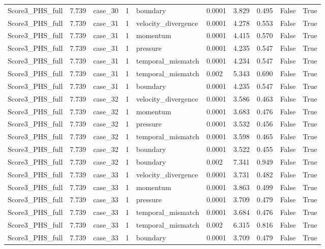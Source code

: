 \begin{longtable}{llllllllll}
Score3\_PHS\_full & 7.739 & case\_30 & 1 & boundary & 0.0001 & 3.829 & 0.495 & False & True \\
Score3\_PHS\_full & 7.739 & case\_31 & 1 & velocity\_divergence & 0.0001 & 4.278 & 0.553 & False & True \\
Score3\_PHS\_full & 7.739 & case\_31 & 1 & momentum & 0.0001 & 4.415 & 0.570 & False & True \\
Score3\_PHS\_full & 7.739 & case\_31 & 1 & pressure & 0.0001 & 4.235 & 0.547 & False & True \\
Score3\_PHS\_full & 7.739 & case\_31 & 1 & temporal\_mismatch & 0.0001 & 4.234 & 0.547 & False & True \\
Score3\_PHS\_full & 7.739 & case\_31 & 1 & temporal\_mismatch & 0.002 & 5.343 & 0.690 & False & True \\
Score3\_PHS\_full & 7.739 & case\_31 & 1 & boundary & 0.0001 & 4.235 & 0.547 & False & True \\
Score3\_PHS\_full & 7.739 & case\_32 & 1 & velocity\_divergence & 0.0001 & 3.586 & 0.463 & False & True \\
Score3\_PHS\_full & 7.739 & case\_32 & 1 & momentum & 0.0001 & 3.683 & 0.476 & False & True \\
Score3\_PHS\_full & 7.739 & case\_32 & 1 & pressure & 0.0001 & 3.532 & 0.456 & False & True \\
Score3\_PHS\_full & 7.739 & case\_32 & 1 & temporal\_mismatch & 0.0001 & 3.598 & 0.465 & False & True \\
Score3\_PHS\_full & 7.739 & case\_32 & 1 & boundary & 0.0001 & 3.522 & 0.455 & False & True \\
Score3\_PHS\_full & 7.739 & case\_32 & 1 & boundary & 0.002 & 7.341 & 0.949 & False & True \\
Score3\_PHS\_full & 7.739 & case\_33 & 1 & velocity\_divergence & 0.0001 & 3.731 & 0.482 & False & True \\
Score3\_PHS\_full & 7.739 & case\_33 & 1 & momentum & 0.0001 & 3.863 & 0.499 & False & True \\
Score3\_PHS\_full & 7.739 & case\_33 & 1 & pressure & 0.0001 & 3.709 & 0.479 & False & True \\
Score3\_PHS\_full & 7.739 & case\_33 & 1 & temporal\_mismatch & 0.0001 & 3.684 & 0.476 & False & True \\
Score3\_PHS\_full & 7.739 & case\_33 & 1 & temporal\_mismatch & 0.002 & 6.315 & 0.816 & False & True \\
Score3\_PHS\_full & 7.739 & case\_33 & 1 & boundary & 0.0001 & 3.709 & 0.479 & False & True \\

\end{longtable}
